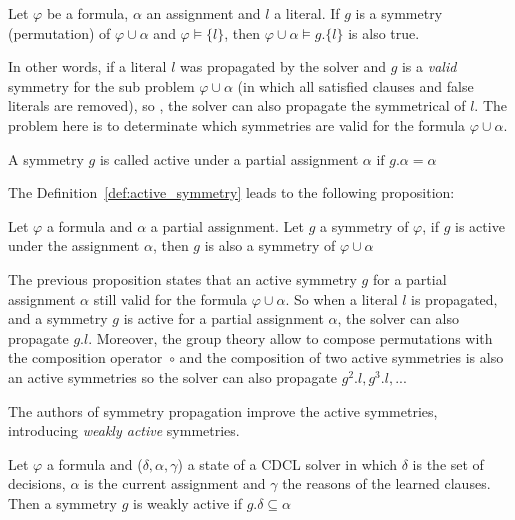 \begin{proposition}
	\label{prop:symmetry_propagation}
	Let $\varphi$ be a formula, $\alpha$ an assignment and $l$ a literal. 
	If $g$ is a symmetry (permutation) of $\varphi \cup \alpha$ and
	$\varphi \models \{l\}$, then $\varphi \cup \alpha \models g.\{l\}$ is also true.
\end{proposition}

In other words, if a literal $l$ was propagated by the solver and $g$ is a \emph{valid} symmetry for the
sub problem $\varphi \cup \alpha$ (in which all satisfied clauses and false literals are removed), so , the solver can
also propagate the symmetrical of $l$. The problem here is to determinate which symmetries are valid for the formula
$\varphi \cup \alpha$.

\begin{definition}
	\label{def:active_symmetry}
	A symmetry $g$ is called active under a partial assignment $\alpha$ $\text{if } g.\alpha = \alpha$
\end{definition}

The Definition~\ref{def:active_symmetry} leads to the following proposition:

\begin{proposition}
	\label{prop:active_symmetry}
	Let $\varphi$ a formula and $\alpha$ a partial assignment. Let $g$ a symmetry of $\varphi$,
	if $g$ is active under the assignment $\alpha$, then $g$ is also a symmetry of $\varphi \cup \alpha$
\end{proposition}

The previous proposition states that an active symmetry $g$ for a partial assignment $\alpha$ still valid for
the formula $\varphi \cup \alpha$. So when a literal $l$ is propagated, and a symmetry $g$ is active for a
partial assignment $\alpha$, the solver can also propagate $g.l$. 
Moreover, the group theory allow to compose permutations with the composition operator~$\circ$ and the composition of two active symmetries is also an active symmetries so the solver can also propagate $g^2.l, g^3.l, ... $


The authors of symmetry propagation improve the active symmetries, introducing \emph{weakly active} symmetries.

\begin{definition}
	\label{def:weakly_active_symmetry}
	Let $\varphi$ a formula and ($\delta, \alpha, \gamma$) a state of a CDCL solver in which $\delta$ is the set of decisions,
	$\alpha$ is the current assignment and $\gamma$ the reasons of the learned clauses. Then a symmetry $g$ is weakly active 
	if $g.\delta \subseteq \alpha$
\end{definition}

